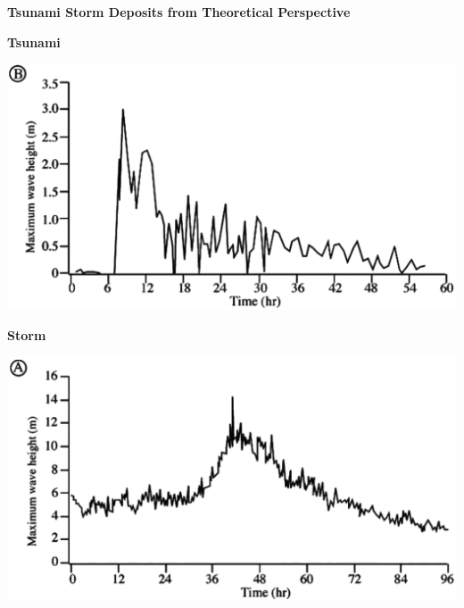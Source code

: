 \documentclass{beamer}
\begin{document}
\begin{frame}[c]
\centering
\textbf{\color{DarkBlue}\huge Tsunami Storm Deposits from Theoretical Perspective	}
\end{frame}

\begin{frame}[t]
\begin{center}
\textbf{\huge Tsunami}

  \vspace*{3.5em} \includegraphics[scale=0.25]{Maxeta_TSt.png} \\
\end{center}
\end{frame}

\begin{frame}[t]
\begin{center}
\textbf{\huge Storm}

  \vspace*{3.5em} \includegraphics[scale=0.25]{Maxeta_STt.png} \\
\end{center}
\end{frame}
\end{document}
